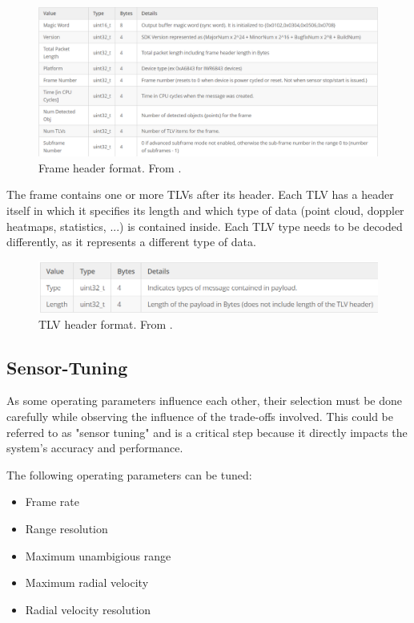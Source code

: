 \begin{figure}[!htbp]
    \centering
    \includegraphics[width=1.0\linewidth]{images/FrameFormatHeader.png}
    \caption{Frame header format. From \cite{mmwave_demo_output}.}
    \label{fig:Frame header format}
\end{figure}
\FloatBarrier\noindent
The frame contains one or more TLVs after its header.
Each TLV has a header itself in which it specifies its length and which type of data (point cloud, doppler heatmaps, statistics, ...) is contained inside.
Each TLV type needs to be decoded differently, as it represents a different type of data.
\begin{figure}[!htbp]
    \centering
    \includegraphics[width=0.95\linewidth]{images/TLVHeader.png}
    \caption{TLV header format. From \cite{mmwave_demo_output}.}
    \label{fig:TLV header format}
\end{figure}
\FloatBarrier

\subsection{Sensor-Tuning}
As some operating parameters influence each other, their selection must be done carefully while observing the influence of the trade-offs involved.
This could be referred to as "sensor tuning" and is a critical step because it directly impacts the system's accuracy and performance.

The following operating parameters can be tuned:
\begin{itemize}
    \item Frame rate
    \item Range resolution
    \item Maximum unambigious range
    \item Maximum radial velocity
    \item Radial velocity resolution
\end{itemize}

